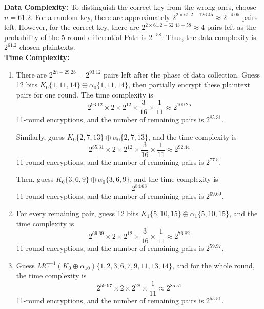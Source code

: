 \documentclass[journal=tosc,preprint]{iacrtrans}
\begin{document}
    \textbf{Data Complexity:}
    To distinguish the correct key from the wrong ones, choose $n = 61.2$. For a random key, there are approximately $2^{2 \times 61.2 - 126.45} \approx 2^{-4.05}$ pairs left. However, for the correct key, there are $2^{2 \times 61.2 - 62.43 - 58} \approx 4$ pairs left as the probability of the 5-round differential Path is $2^{-58}$. Thus, the data complexity is $2^{61.2}$ chosen plaintexts.\\
    \newline
    \textbf{Time Complexity:}
    \begin{enumerate}
        \item There are $2^{2n-29.28} = 2^{93.12}$ pairs left after the phase of data collection.
              Guess 12 bits $K_0\{1, 11, 14\} \oplus \alpha_0\{1, 11, 14\}$, then partially encrypt these plaintext pairs for one round.
              The time complexity is
              \[
                  2^{93.12} \times 2 \times 2^{12} \times \frac{3}{16} \times \frac{1}{11} \approx 2^{100.25}
              \]
              11-round encryptions, and the number of remaining pairs is $2^{85.31}$.

              Similarly, guess $K_0\{2, 7, 13\} \oplus \alpha_0\{2, 7, 13\}$, and the time complexity is
              \[
                  2^{85.31} \times 2 \times 2^{12} \times \frac{3}{16} \times \frac{1}{11} \approx 2^{92.44}
              \]
              11-round encryptions, and the number of remaining pairs is $2^{77.5}$.

              Then, guess $K_0\{3, 6, 9\} \oplus \alpha_0\{3, 6, 9\}$, and the time complexity is
              \[
                  2^{84.63}
              \]
              11-round encryptions, and the number of remaining pairs is $2^{69.69}$.

        \item For every remaining pair, guess 12 bits $K_1\{5, 10, 15\} \oplus \alpha_1\{5, 10, 15\}$, and the time complexity is
              \[
                  2^{69.69} \times 2 \times 2^{12} \times \frac{3}{16} \times \frac{1}{11} \approx 2^{76.82}
              \]
              11-round encryptions, and the number of remaining pairs is $2^{59.97}$.

        \item Guess $MC^{-1}(K_0 \oplus \alpha_{10})\{1, 2, 3, 6, 7, 9, 11, 13, 14\}$, and for the whole round, the time complexity is
              \[
                  2^{59.97} \times 2 \times 2^{28} \times \frac{1}{11} \approx 2^{85.51}
              \]
              11-round encryptions, and the number of remaining pairs is $2^{55.51}$.


\end{enumerate}
\end{document}
